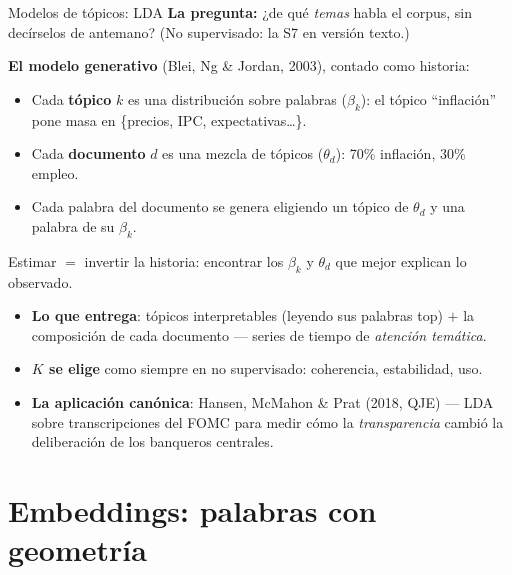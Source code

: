 \documentclass{beamer}
\newcommand{\1}{\mathbb{I}}
\begin{document}
\begin{frame}{Modelos de tópicos: LDA}
\small
\textbf{La pregunta:} ¿de qué \emph{temas} habla el corpus, sin decírselos de antemano? (No supervisado: la S7 en versión texto.)
\pause

\vspace{0.15cm}
\textbf{El modelo generativo} (Blei, Ng \& Jordan, 2003), contado como historia:
\begin{itemize}\itemsep3pt
  \item Cada \textbf{tópico} $k$ es una distribución sobre palabras ($\beta_k$): el tópico ``inflación'' pone masa en \{precios, IPC, expectativas\ldots\}.
  \item Cada \textbf{documento} $d$ es una mezcla de tópicos ($\theta_d$): 70\% inflación, 30\% empleo.
  \item Cada palabra del documento se genera eligiendo un tópico de $\theta_d$ y una palabra de su $\beta_k$.
\end{itemize}
Estimar $=$ invertir la historia: encontrar los $\beta_k$ y $\theta_d$ que mejor explican lo observado.
\pause

\vspace{0.15cm}
\begin{itemize}\itemsep4pt
  \item \textbf{Lo que entrega}: tópicos interpretables (leyendo sus palabras top) $+$ la composición de cada documento --- series de tiempo de \emph{atención temática}.
  \item \textbf{$K$ se elige} como siempre en no supervisado: coherencia, estabilidad, uso. \pause
  \item \textbf{La aplicación canónica}: Hansen, McMahon \& Prat (2018, QJE) --- LDA sobre transcripciones del FOMC para medir cómo la \emph{transparencia} cambió la deliberación de los banqueros centrales.
\end{itemize}
\end{frame}


\section{Embeddings: palabras con geometría}
\begin{frame}[noframenumbering]
\tableofcontents[currentsection]
\end{frame}
\end{document}
